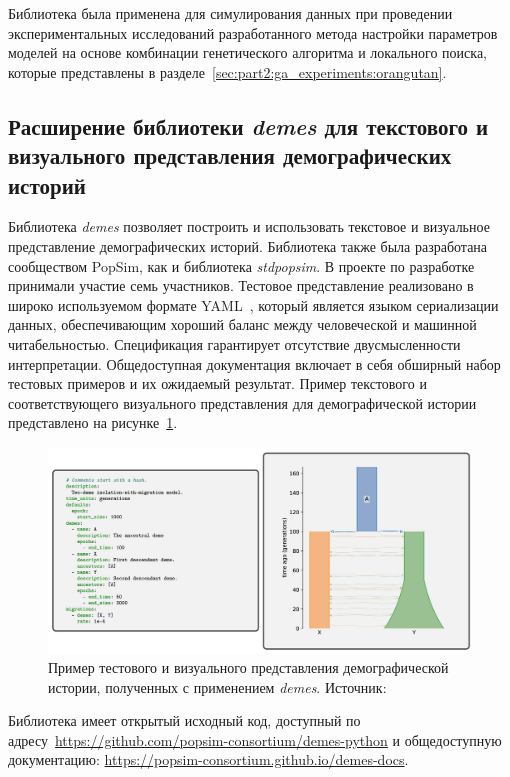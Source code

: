 Библиотека \stdpopsim была применена для симулирования данных при проведении экспериментальных исследований разработанного метода настройки параметров моделей на основе комбинации генетического алгоритма и локального поиска, которые представлены в разделе~\ref{sec:part2:ga_experiments:orangutan}.

\subsection{Расширение библиотеки \textit{demes} для текстового и визуального представления демографических историй}

Библиотека \textit{demes} позволяет построить и использовать текстовое и визуальное представление демографических историй.
Библиотека также была разработана сообществом PopSim, как и библиотека \textit{stdpopsim}.
В проекте по разработке принимали участие семь участников.
Тестовое представление реализовано в широко используемом формате YAML~\cite{ben2009yaml}, который является языком сериализации данных, обеспечивающим хороший баланс между человеческой и машинной читабельностью.
Спецификация гарантирует отсутствие двусмысленности интерпретации.
Общедоступная документация включает в себя обширный набор тестовых примеров и их ожидаемый результат.
Пример текстового и соответствующего визуального представления для демографической истории представлено на рисунке~\ref{fig:part5:demes_example}.

\begin{figure}[ht]
    \centering
    \includegraphics[width=\linewidth]{images/part5/showcase.pdf}
    \caption{Пример тестового и визуального представления демографической истории, полученных с применением \textit{demes}. Источник:~\cite{gower2022demes}}
    \label{fig:part5:demes_example}
\end{figure}

Библиотека имеет открытый исходный код, доступный по адресу~\url{https://github.com/popsim-consortium/demes-python} и общедоступную документацию: \url{https://popsim-consortium.github.io/demes-docs}.

